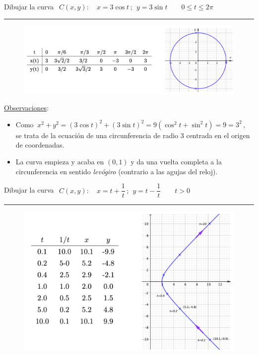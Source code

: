 \begin{miejercicio}

Dibujar la curva $\ \ C(x,y):\quad x=3\cos t\, ; \ \ y=3\sin t \qquad 0\le t\le 2\pi$	

\rule{300pt}{0.2pt}

\begin{figure}[H]
	\centering
	\includegraphics[width=.7\textwidth]{img-polares/polares03.png}
	\end{figure}
\end{miejercicio}

\underline{Observaciones}:
\begin{itemize}
\item Como $\ x^2+y^2=(3\cos t)^2+(3\sin t)^2=9(\cos^2 t+\sin^2 t)=9=3^2\, , \ $ se trata de la ecuación de una circunferencia de radio $3$  centrada en el origen de coordenadas.	
\item La curva empieza y acaba en $(0,1)$ y da una vuelta completa a la circunferencia en sentido \emph{levógiro} (contrario a las agujas del reloj).
\end{itemize}


\vspace{5mm}


\begin{miejercicio}

Dibujar la curva $\ \ C(x,y):\quad x=t+\dfrac 1 t\, ; \ \ y=t-\dfrac 1 t \qquad t>0$	

 \rule{300pt}{0.2pt}

\begin{figure}[H]
	\centering
	\includegraphics[width=.5\textwidth]{img-polares/polares04.png}
	\end{figure}
\end{miejercicio}

